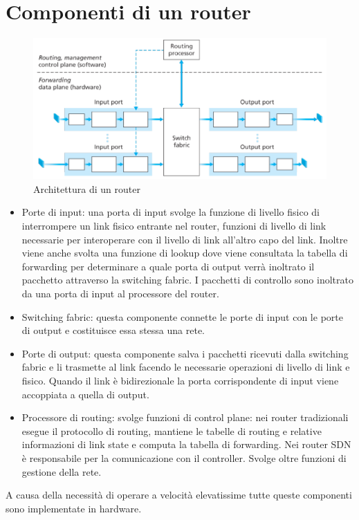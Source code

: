\section{Componenti di un router}
\begin{figure}[h]
\includegraphics[width=\textwidth]{Pictures/Router.png}
\caption{Architettura di un router}
\end{figure}
\begin{itemize}
\item Porte di input: una porta di input svolge la funzione di livello fisico di interrompere un link fisico entrante nel router, funzioni di livello di 
link necessarie per interoperare con il livello di link all'altro capo del link. Inoltre viene anche svolta una funzione di lookup dove viene consultata la 
tabella di forwarding per determinare a quale porta di output verr\`a inoltrato il pacchetto attraverso la switching fabric. I pacchetti di controllo sono
inoltrato da una porta di input al processore del router.
\item Switching fabric: questa componente connette le porte di input con le porte di output e costituisce essa stessa una rete. 
\item Porte di output: questa componente salva i pacchetti ricevuti dalla switching fabric e li trasmette al link facendo le necessarie operazioni 
di livello di link e fisico. Quando il link \`e bidirezionale la porta corrispondente di input viene accoppiata a quella di output. 
\item Processore di routing: svolge funzioni di control plane: nei router tradizionali esegue il protocollo di routing, mantiene le tabelle di routing e 
relative informazioni di link state e computa la tabella di forwarding. Nei router SDN \`e responsabile per la comunicazione con il controller. Svolge oltre
funzioni di gestione della rete.
\end{itemize}
A causa della necessit\`a di operare a velocit\`a elevatissime tutte queste componenti sono implementate in hardware.
